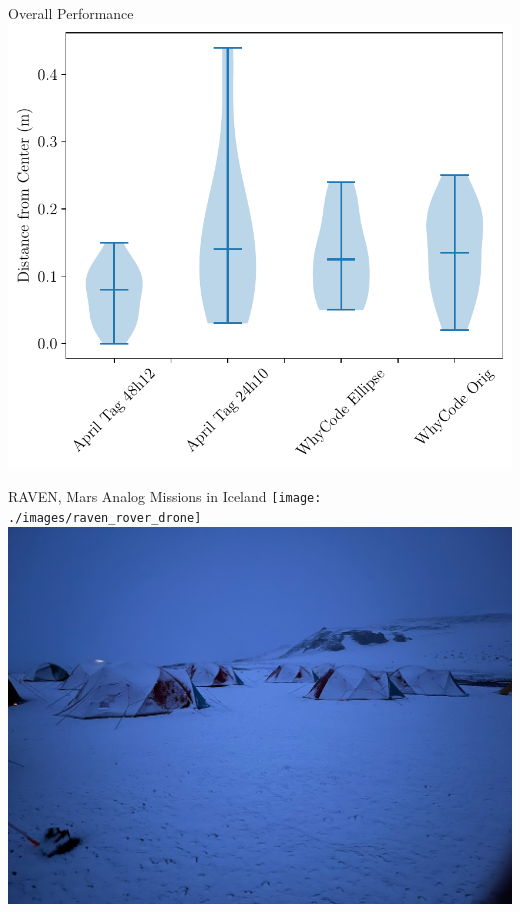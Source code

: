 \documentclass[aspectratio=169]{beamer}
\begin{document}
\begin{frame}{Overall Performance}
	\centering
	\includegraphics[height=\textheight]{./images/violin_plot_landing_radii}
\end{frame}

\begin{frame}{RAVEN, Mars Analog Missions in Iceland}
	\centering
	\texttt{[image: ./images/raven\_rover\_drone]}
	\includegraphics[height=0.6\textheight]{./images/dreki_small_tents_snow}
\end{frame}
\end{document}
